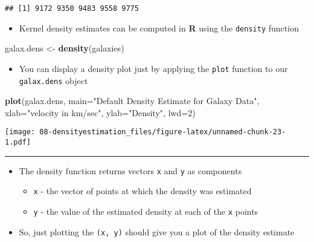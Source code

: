 \documentclass[]{book}
\newenvironment{Shaded}{\begin{snugshade}}{\end{snugshade}}
\newcommand{\DataTypeTok}[1]{\textcolor[rgb]{0.13,0.29,0.53}{#1}}
\newcommand{\DecValTok}[1]{\textcolor[rgb]{0.00,0.00,0.81}{#1}}
\newcommand{\KeywordTok}[1]{\textcolor[rgb]{0.13,0.29,0.53}{\textbf{#1}}}
\newcommand{\NormalTok}[1]{#1}
\newcommand{\StringTok}[1]{\textcolor[rgb]{0.31,0.60,0.02}{#1}}
\providecommand{\tightlist}{%
  \setlength{\itemsep}{0pt}\setlength{\parskip}{0pt}}
\begin{document}
\begin{verbatim}
## [1] 9172 9350 9483 9558 9775
\end{verbatim}

\begin{itemize}
\tightlist
\item
  Kernel density estimates can be computed in \textbf{R} using the \texttt{density} function
\end{itemize}

\begin{Shaded}
\begin{Highlighting}[]
\NormalTok{galax.dens <-}\StringTok{ }\KeywordTok{density}\NormalTok{(galaxies)}
\end{Highlighting}
\end{Shaded}

\begin{itemize}
\tightlist
\item
  You can display a density plot just by applying the \texttt{plot} function to our \texttt{galax.dens} object
\end{itemize}

\begin{Shaded}
\begin{Highlighting}[]
\KeywordTok{plot}\NormalTok{(galax.dens, }\DataTypeTok{main=}\StringTok{"Default Density Estimate for Galaxy Data"}\NormalTok{, }
     \DataTypeTok{xlab=}\StringTok{"velocity in km/sec"}\NormalTok{, }\DataTypeTok{ylab=}\StringTok{"Density"}\NormalTok{, }\DataTypeTok{lwd=}\DecValTok{2}\NormalTok{)}
\end{Highlighting}
\end{Shaded}

\texttt{[image: 08-densityestimation\_files/figure-latex/unnamed-chunk-23-1.pdf]}

\begin{center}\rule{0.5\linewidth}{\linethickness}\end{center}

\begin{itemize}
\tightlist
\item
  The density function returns vectors \texttt{x} and \texttt{y} as components

  \begin{itemize}
  \tightlist
  \item
    \texttt{x} - the vector of points at which the density was estimated
  \item
    \texttt{y} - the value of the estimated density at each of the \texttt{x} points
  \end{itemize}
\item
  So, just plotting the \texttt{(x,\ y)} should give you a plot of the density estimate
\end{itemize}
\end{document}
